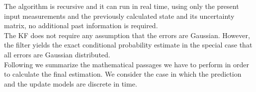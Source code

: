 The algorithm is recursive and it can run in real time, using only the present input measurements and the previously calculated state and its uncertainty matrix, no additional past information is required.\\
The KF does not require any assumption that the errors are Gaussian. However, the filter yields the exact conditional probability estimate in the special case that all errors are Gaussian distributed.\\

Following we summarize the mathematical passages we have to perform in order to calculate the final estimation. We consider the case in which the prediction and the update models are discrete in time.\\

